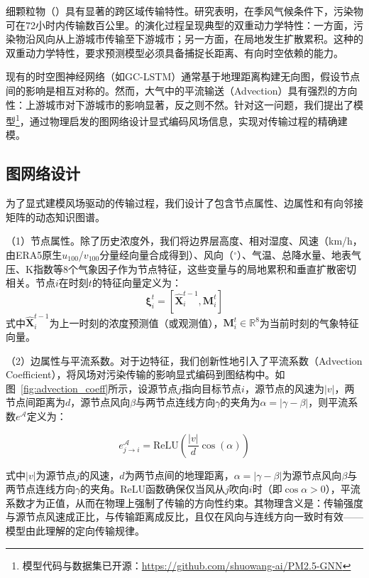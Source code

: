 细颗粒物（\PM）具有显著的跨区域传输特性。研究表明，在季风气候条件下，污染物可在72小时内传输数百公里\citep{pongkiatkul2007assessment,wang2015long,hao2019transport}。\PM 的演化过程呈现典型的双重动力学特性：一方面，污染物沿风向从上游城市传输至下游城市；另一方面，在局地发生扩散累积。这种的双重动力学特性，要求预测模型必须具备捕捉长距离、有向时空依赖的能力。

现有的时空图神经网络（如GC-LSTM\citep{qi2019hybrid}）通常基于地理距离构建无向图，假设节点间的影响是相互对称的。然而，大气中的平流输送（Advection）具有强烈的方向性：上游城市对下游城市的影响显著，反之则不然。针对这一问题，我们提出了\ModelPred\citep{wang2020pm2}模型\footnote{模型代码与数据集已开源：\url{https://github.com/shuowang-ai/PM2.5-GNN}}，通过物理启发的图网络设计显式编码风场信息，实现对\PM 传输过程的精确建模。


\subsection{图网络设计}
\label{subsec:pm25gnn_graph}

为了显式建模风场驱动的传输过程，我们设计了包含节点属性、边属性和有向邻接矩阵的动态知识图谱。

（1）节点属性。除了历史\PM 浓度外，我们将边界层高度、相对湿度、风速（km/h，由ERA5原生$u_{100}$/$v_{100}$分量经向量合成得到）、风向（$^\circ$）、气温、总降水量、地表气压、K指数等8个气象因子作为节点特征，这些变量与\PM 的局地累积和垂直扩散密切相关。节点$i$在时刻$t$的特征向量定义为：
\begin{equation}
    \boldsymbol{\xi}_i^t = [\hat{\mathbf{X}}_i^{t-1}, \mathbf{M}_i^t]
\end{equation}
\noindent 式中$\hat{\mathbf{X}}_i^{t-1}$为上一时刻的\PM 浓度预测值（或观测值），$\mathbf{M}_i^t \in \mathbb{R}^{8}$为当前时刻的气象特征向量。

（2）边属性与平流系数。对于边特征，我们创新性地引入了平流系数（Advection Coefficient），将风场对污染传输的影响显式编码到图结构中。如图~\ref{fig:advection_coeff}所示，设源节点$j$指向目标节点$i$，源节点的风速为$|v|$，两节点间距离为$d$，源节点风向$\beta$与两节点连线方向$\gamma$的夹角为$\alpha = |\gamma - \beta|$，则平流系数$e^{\mathcal{A}}$定义为：

\begin{equation}
    e_{j \to i}^{\mathcal{A}} = \text{ReLU}\left(\frac{|v|}{d} \cos(\alpha)\right)
\label{eq:advection_coeff}
\end{equation}

\noindent 式中$|v|$为源节点$j$的风速，$d$为两节点间的地理距离，$\alpha = |\gamma - \beta|$为源节点风向$\beta$与两节点连线方向$\gamma$的夹角。ReLU函数确保仅当风从$j$吹向$i$时（即$\cos\alpha > 0$），平流系数才为正值，从而在物理上强制了传输的方向性约束。其物理含义是：传输强度与源节点风速成正比，与传输距离成反比，且仅在风向与连线方向一致时有效——模型由此理解的定向传输规律。

